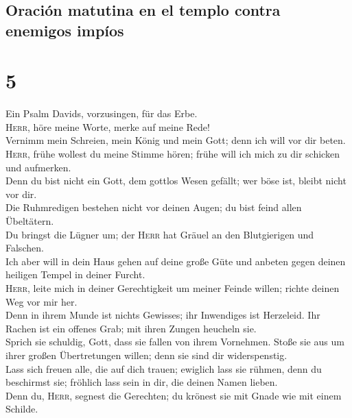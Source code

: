 \hypertarget{oraciuxf3n-matutina-en-el-templo-contra-enemigos-impuxedos}{%
\subsection{Oración matutina en el templo contra enemigos
impíos}\label{oraciuxf3n-matutina-en-el-templo-contra-enemigos-impuxedos}}

\hypertarget{section-4}{%
\section{5}\label{section-4}}

 Ein Psalm Davids, vorzusingen, für das Erbe.\\
 \textsc{Herr}, höre meine Worte, merke auf meine Rede!\\
 Vernimm mein Schreien, mein König und mein Gott; denn ich
will vor dir beten.\\
 \textsc{Herr}, frühe wollest du meine Stimme hören; frühe
will ich mich zu dir schicken und aufmerken.\\
 Denn du bist nicht ein Gott, dem gottlos Wesen gefällt;
wer böse ist, bleibt nicht vor dir.\\
 Die Ruhmredigen bestehen nicht vor deinen Augen; du bist
feind allen Übeltätern.\\
 Du bringst die Lügner um; der \textsc{Herr} hat Gräuel an
den Blutgierigen und Falschen.\\
 Ich aber will in dein Haus gehen auf deine große Güte und
anbeten gegen deinen heiligen Tempel in deiner Furcht.\\
 \textsc{Herr}, leite mich in deiner Gerechtigkeit um
meiner Feinde willen; richte deinen Weg vor mir her.\\
 Denn in ihrem Munde ist nichts Gewisses; ihr Inwendiges
ist Herzeleid. Ihr Rachen ist ein offenes Grab; mit ihren Zungen
heucheln sie.\\
 Sprich sie schuldig, Gott, dass sie fallen von ihrem
Vornehmen. Stoße sie aus um ihrer großen Übertretungen willen; denn sie
sind dir widerspenstig.\\
 Lass sich freuen alle, die auf dich trauen; ewiglich
lass sie rühmen, denn du beschirmst sie; fröhlich lass sein in dir, die
deinen Namen lieben.\\
 Denn du, \textsc{Herr}, segnest die Gerechten; du
krönest sie mit Gnade wie mit einem Schilde.

